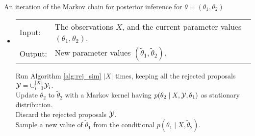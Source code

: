 {
\begin{algo}{An iteration of the Markov chain for posterior inference for $\theta = (\theta_1, \theta_2)$} \label{alg:rej_post}
  \begin{itemize}
    \item[]
\begin{tabular}{p{.9cm}p{12.2cm}}
{Input:}  & The observations $X$, and the current parameter values $({\theta}_1,{\theta}_2)$. \\
{Output:} & New parameter values $(\tilde{\theta}_1,\tilde{\theta}_2)$. \\
\end{tabular}
\begin{tabbing}
  \enspace Run Algorithm \ref{alg:rej_sim} $|X|$ times, keeping all the rejected proposals $\displaystyle {\mathcal{Y}= \cup_{i=1}^{|X|} \mathcal{Y}_i}$. \\
  \enspace Update $\theta_2$ to $\tilde{\theta}_2$ with a Markov kernel having $p({\theta}_2\mid X,\mathcal{Y},\theta_1)$ as stationary distribution.\\
  \enspace Discard the rejected proposals $\mathcal{Y}$.\\
  \enspace Sample a new value of ${\tilde{\theta}}_1$ from the conditional $p(\theta_1\mid X,\tilde{\theta}_2)$. 
\end{tabbing}
  \end{itemize}
\end{algo}
}


